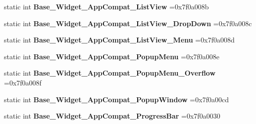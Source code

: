 \begin{DoxyCompactItemize}
\item 
\mbox{\label{classandroid_1_1support_1_1design_1_1R_1_1style_ae7202d488f36e9e0461eafadd71b141e}} 
static int {\bfseries Base\+\_\+\+Widget\+\_\+\+App\+Compat\+\_\+\+List\+View} =0x7f0a008b
\item 
\mbox{\label{classandroid_1_1support_1_1design_1_1R_1_1style_ab93fe0b5a47b4dfb792f800a61dd730c}} 
static int {\bfseries Base\+\_\+\+Widget\+\_\+\+App\+Compat\+\_\+\+List\+View\+\_\+\+Drop\+Down} =0x7f0a008c
\item 
\mbox{\label{classandroid_1_1support_1_1design_1_1R_1_1style_ad31809c6233b2fa1b0f7227e9856a860}} 
static int {\bfseries Base\+\_\+\+Widget\+\_\+\+App\+Compat\+\_\+\+List\+View\+\_\+\+Menu} =0x7f0a008d
\item 
\mbox{\label{classandroid_1_1support_1_1design_1_1R_1_1style_a818fa32e79bb88f49310026fc5fd4482}} 
static int {\bfseries Base\+\_\+\+Widget\+\_\+\+App\+Compat\+\_\+\+Popup\+Menu} =0x7f0a008e
\item 
\mbox{\label{classandroid_1_1support_1_1design_1_1R_1_1style_ae1778421956402b2ab5c901839eb4d01}} 
static int {\bfseries Base\+\_\+\+Widget\+\_\+\+App\+Compat\+\_\+\+Popup\+Menu\+\_\+\+Overflow} =0x7f0a008f
\item 
\mbox{\label{classandroid_1_1support_1_1design_1_1R_1_1style_a27f4f76d0145baae52529f9d3989b1c0}} 
static int {\bfseries Base\+\_\+\+Widget\+\_\+\+App\+Compat\+\_\+\+Popup\+Window} =0x7f0a00cd
\item 
\mbox{\label{classandroid_1_1support_1_1design_1_1R_1_1style_a8d21622fc117399da3daf5792e80ccb5}} 
static int {\bfseries Base\+\_\+\+Widget\+\_\+\+App\+Compat\+\_\+\+Progress\+Bar} =0x7f0a0030
\item 
\mbox{\label{classandroid_1_1support_1_1design_1_1R_1_1style_aa9cd7749577dc49ba9d69db3204f36e7}} 

\end{DoxyCompactItemize}
